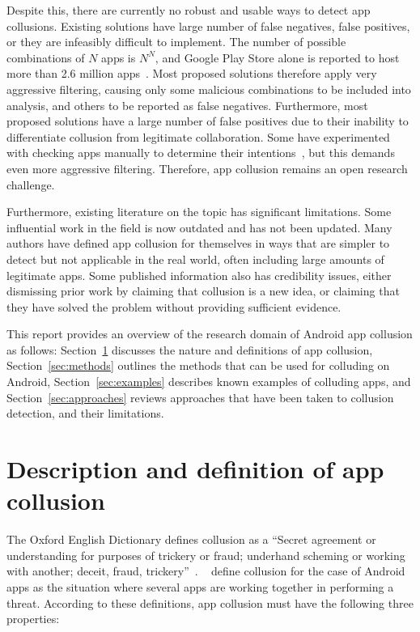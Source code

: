 \documentclass[article, oneside]{aaltoseries}
\newcommand{\TODO}[1]{\todo[inline]{#1}}
\newcommand{\Sref}[1]{Section~\ref{#1}}
\begin{document}
Despite this, there are currently no robust and usable ways to detect app collusions. Existing solutions have large number of false negatives, false positives, or they are infeasibly difficult to implement. The number of possible combinations of $N$ apps is $N^N$, and Google Play Store alone is reported to host more than 2.6 million apps~\cite{Statista2018}. Most proposed solutions therefore apply very aggressive filtering, causing only some malicious combinations to be included into analysis, and others to be reported as false negatives. Furthermore, most proposed solutions have a large number of false positives due to their inability to differentiate collusion from legitimate collaboration. Some have experimented with checking apps manually to determine their intentions~\cite{Muttik2016}, but this demands even more aggressive filtering. Therefore, app collusion remains an open research challenge.

Furthermore, existing literature on the topic has significant limitations. Some influential work in the field is now outdated and has not been updated. Many authors have defined app collusion for themselves in ways that are simpler to detect but not applicable in the real world, often including large amounts of legitimate apps. Some published information also has credibility issues, either dismissing prior work by claiming that collusion is a new idea, or claiming that they have solved the problem without providing sufficient evidence.

This report provides an overview of the research domain of Android app collusion as follows: \Sref{sec:def} discusses the nature and definitions of app collusion, \Sref{sec:methods} outlines the methods that can be used for colluding on Android, \Sref{sec:examples} describes known examples of colluding apps, and \Sref{sec:approaches} reviews approaches that have been taken to collusion detection, and their limitations.

\section{Description and definition of app collusion}
\label{sec:def}

\TODO{Consider section preview}

The Oxford English Dictionary defines collusion as a ``Secret agreement or understanding for purposes of trickery or fraud; underhand scheming or working with another; deceit, fraud, trickery''~\cite{OEDcollusion}. \citeauthor{Asavoae2017}~\cite{Asavoae2017} define collusion for the case of Android apps as the situation where several apps are working together in performing a threat. According to these definitions, app collusion must have the following three properties:
\end{document}
